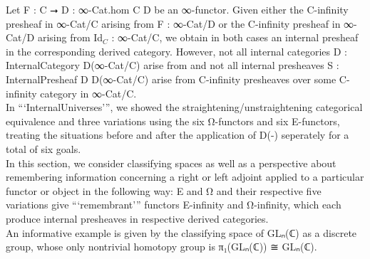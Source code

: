 \documentclass{book}
\theoremstyle{definition}
\begin{document}
Let F : C ⭢ D : ∞-Cat.hom C D be an ∞-functor. Given either the C-infinity presheaf in ∞-Cat/C arising from F : ∞-Cat/D or the C-infinity presheaf in ∞-Cat/D arising from Id${}_{C}$ : ∞-Cat/C, we obtain in both cases an internal presheaf in the corresponding derived category. However, not all internal categories D : InternalCategory D(∞-Cat/C) arise from \iffalse C-InfinityCategory ∞-Cat/C \fi and not all internal presheaves S : InternalPresheaf D D(∞-Cat/C) arise from C-infinity presheaves over some C-infinity category in ∞-Cat/C.\\

In ```InternalUniverses''', we showed the straightening/unstraightening categorical equivalence and three variations using the six Ω-functors and six E-functors, treating the situations before and after the application of D(-) seperately for a total of six goals.\\

In this section, we consider classifying spaces as well as a perspective about remembering information concerning a right or left adjoint applied to a particular functor or object in the following way: E and Ω and their respective five variations give  ```remembrant''' functors E-infinity and Ω-infinity, which each produce internal presheaves in respective derived categories.\\

An informative example is given by the classifying space of GLₙ(ℂ) as a discrete group, whose only nontrivial homotopy group is π₁(GLₙ(ℂ)) ≅ GLₙ(ℂ).\\

\thispagestyle{empty}

\ \\
{\footnotesize
\begin{center}
\end{center}}
 
\end{document}
